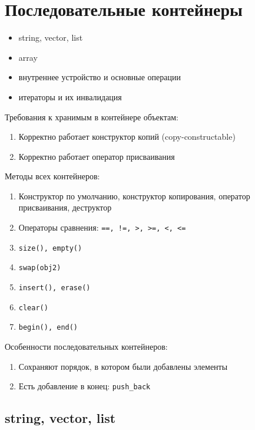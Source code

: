 \section{Последовательные контейнеры}
\begin{itemize}[noitemsep]
	\item string, vector, list
	\item array
	\item внутреннее устройство и основные операции
	\item итераторы и их инвалидация
\end{itemize}
Требования к хранимым в контейнере объектам:
\begin{enumerate}[noitemsep]
	\item Корректно  работает конструктор копий (copy-constructable)
	\item Корректно работает оператор присваивания
\end{enumerate} 
Методы всех контейнеров:
\begin{enumerate}[noitemsep]
    \item Конструктор по умолчанию, конструктор копирования, оператор присваивания, деструктор
	\item Операторы сравнения: \texttt{==, !=,   >, >=, <, <=}
	\item \texttt{size(), empty()}
	\item \texttt{swap(obj2)}
	\item \texttt{insert(), erase()}
	\item \texttt{clear()}
	\item \texttt{begin(), end()}
\end{enumerate} 
Особенности последовательных контейнеров:
\begin{enumerate}[noitemsep]
    \item Сохраняют порядок, в котором были добавлены элементы
	\item  Есть добавление в конец: \texttt{push\_back}
\end{enumerate} 
\subsection{string, vector, list}
